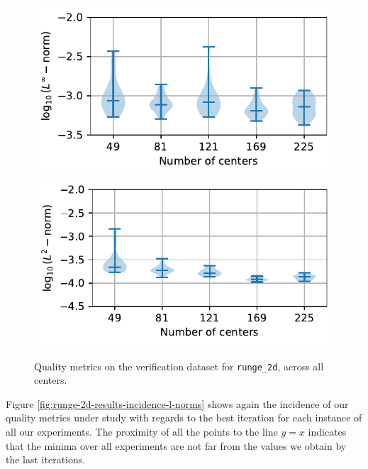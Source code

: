 \documentclass[12pt]{report} %
\begin{document}
\begin{figure}
  \includegraphics[width=.45\textwidth]{imagenes/experiments/2d/statistical_2d_full_scheduler_interpolation/runge_2d/violins_linf_runge_2d_endgame.pdf}
  \includegraphics[width=.45\textwidth]{imagenes/experiments/2d/statistical_2d_full_scheduler_interpolation/runge_2d/violins_l2_runge_2d_endgame.pdf}
  \caption{Quality metrics on the verification dataset for \texttt{runge\_2d}, across all centers.}
  \label{fig:violins-runge-2d}
\end{figure}

Figure \ref{fig:runge-2d-results-incidence-l-norms} shows again the incidence of our quality metrics under study with regards to the best iteration for each instance of all our experiments. The proximity of all the points to the line $y=x$ indicates that the minima over all experiments are not far from the values we obtain by the last iterations. 
\end{document}
